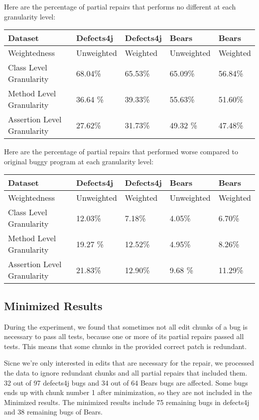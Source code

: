 \documentclass[sigconf, timestamp-false, anonymous=true]{acmart}
\begin{document}
    Here are the percentage of partial repairs that performs no different at each granularity level:
    
    \begin{tabular}{| l | l | l | l | l |} \hline
    Dataset & Defects4j & Defects4j & Bears & Bears  \\ \hline
    Weightedness & Unweighted & Weighted & Unweighted & Weighted \\ \hline
    Class Level Granularity & 68.04\% & 65.53\% & 65.09\% & 56.84\%\\
    Method Level Granularity & 36.64 \% & 39.33\% & 55.63\% & 51.60\% \\
    Assertion Level Granularity & 27.62\% & 31.73\% & 49.32 \% & 47.48\% \\
    \hline
    
    \end{tabular}
    
    Here are the percentage of partial repairs that performed worse compared to original buggy program at each granularity level:
    
    \begin{tabular}{| l | l | l | l | l |} \hline
    Dataset & Defects4j & Defects4j & Bears & Bears  \\ \hline
    Weightedness & Unweighted & Weighted & Unweighted & Weighted \\ \hline
    Class Level Granularity & 12.03\% & 7.18\% & 4.05\% & 6.70\%\\
    Method Level Granularity & 19.27 \% & 12.52\% & 4.95\% & 8.26\% \\
    Assertion Level Granularity & 21.83\% & 12.90\% & 9.68 \% & 11.29\% \\
    \hline
    
    \end{tabular}
    
    

\subsection{Minimized Results}

During the experiment, we found that sometimes not all edit chunks of a bug is necessary to pass all tests, because one or more of its partial repairs passed all tests. This means that some chunks in the provided correct patch is redundant. 

Sicne we're only interested in edits that are necessary for the repair, we processed the data to ignore redundant chunks and all partial repairs that included them. 32 out of 97 defects4j bugs and 34 out of 64 Bears bugs are affected. Some bugs ends up with chunk number 1 after minimization, so they are not included in the Minimized results. The minimized results include 75 remaining bugs in defects4j and 38 remaining bugs of Bears.
\end{document}

